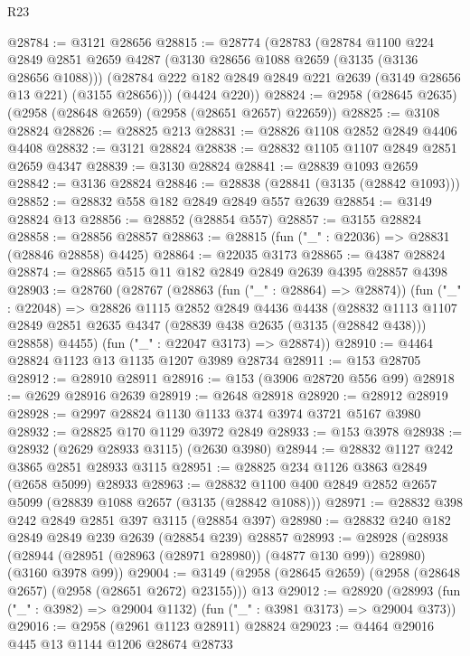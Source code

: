 \begin{lexlean}{R23}
\begin{coremodule}
@28784 := @3121 @28656
@28815 := @28774
    (@28783
      (@28784
        @1100
        @224
        @2849
        @2851
        @2659
        @4287
        (@3130 @28656 @1088 @2659 (@3135 (@3136 @28656 @1088)))
        (@28784 @222 @182 @2849 @2849 @221 @2639 (@3149 @28656 @13 @221) (@3155 @28656)))
      (@4424 @220))
@28824 := @2958 (@28645 @2635) (@2958 (@28648 @2659) (@2958 (@28651 @2657) @22659))
@28825 := @3108 @28824
@28826 := @28825 @213
@28831 := @28826 @1108 @2852 @2849 @4406 @4408
@28832 := @3121 @28824
@28838 := @28832 @1105 @1107 @2849 @2851 @2659 @4347
@28839 := @3130 @28824
@28841 := @28839 @1093 @2659
@28842 := @3136 @28824
@28846 := @28838 (@28841 (@3135 (@28842 @1093)))
@28852 := @28832 @558 @182 @2849 @2849 @557 @2639
@28854 := @3149 @28824 @13
@28856 := @28852 (@28854 @557)
@28857 := @3155 @28824
@28858 := @28856 @28857
@28863 := @28815 (fun ("_" : @22036) => @28831 (@28846 @28858) @4425)
@28864 := @22035 @3173
@28865 := @4387 @28824
@28874 := @28865 @515 @11 @182 @2849 @2849 @2639 @4395 @28857 @4398
@28903 := @28760
    (@28767
      (@28863 (fun ("_" : @28864) => @28874))
      (fun ("_" : @22048) =>
      @28826
        @1115
        @2852
        @2849
        @4436
        @4438
        (@28832
          @1113
          @1107
          @2849
          @2851
          @2635
          @4347
          (@28839 @438 @2635 (@3135 (@28842 @438)))
          @28858)
        @4455)
      (fun ("_" : @22047 @3173) => @28874))
@28910 := @4464 @28824 @1123 @13 @1135 @1207 @3989 @28734
@28911 := @153 @28705
@28912 := @28910 @28911
@28916 := @153 (@3906 @28720 @556 @99)
@28918 := @2629 @28916 @2639
@28919 := @2648 @28918
@28920 := @28912 @28919
@28928 := @2997 @28824 @1130 @1133 @374 @3974 @3721 @5167 @3980
@28932 := @28825 @170 @1129 @3972 @2849
@28933 := @153 @3978
@28938 := @28932 (@2629 @28933 @3115) (@2630 @3980)
@28944 := @28832 @1127 @242 @3865 @2851 @28933 @3115
@28951 := @28825 @234 @1126 @3863 @2849 (@2658 @5099) @28933
@28963 := @28832 @1100 @400 @2849 @2852 @2657 @5099 (@28839 @1088 @2657 (@3135 (@28842 @1088)))
@28971 := @28832 @398 @242 @2849 @2851 @397 @3115 (@28854 @397)
@28980 := @28832 @240 @182 @2849 @2849 @239 @2639 (@28854 @239) @28857
@28993 := @28928
    (@28938 (@28944 (@28951 (@28963 (@28971 @28980)) (@4877 @130 @99)) @28980) (@3160 @3978 @99))
@29004 := @3149 (@2958 (@28645 @2659) (@2958 (@28648 @2657) (@2958 (@28651 @2672) @23155))) @13
@29012 := @28920
    (@28993 (fun ("_" : @3982) => @29004 @1132) (fun ("_" : @3981 @3173) => @29004 @373))
@29016 := @2958 (@2961 @1123 @28911) @28824
@29023 := @4464 @29016 @445 @13 @1144 @1206 @28674 @28733

\end{coremodule}
\end{lexlean}
